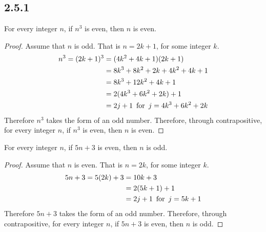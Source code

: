 





\subsection*{2.5.1}
\begin{enumerate}
   For every integer $n$, if $n^3$ is even, then $n$ is even.
  \begin{proof}
    Assume that $n$ is odd. That is $n = 2k+1$, for some integer $k$.
    \begin{align*}
      n^3 = (2k+1)^3 & = (4k^2+4k+1)(2k+1)                \\
                     & = 8k^3 + 8k^2 + 2k + 4k^2 + 4k + 1 \\
                     & = 8k^3 + 12k^2 + 4k + 1            \\
                     & = 2(4k^3+6k^2+2k) + 1              \\
                     & = 2j+1 \operatorname{~\text{for}~} j = 4k^3+6k^2+2k
    \end{align*}
    Therefore $n^3$ takes the form of an odd number.
    Therefore, through contrapositive, for every integer $n$, if $n^3$ is even,
    then $n$ is even.
  \end{proof}
   For every integer $n$, if $5n+3$ is even, then $n$ is odd.
  \begin{proof}
    Assume that $n$ is even. That is $n = 2k$, for some integer $k$.
    \begin{align*}
      5n+3 = 5(2k) + 3 & = 10k + 3             \\
                       & = 2(5k+1) + 1         \\
                       & = 2j+1 \operatorname{~\text{for}~} j = 5k+1
    \end{align*}
    Therefore $5n+3$ takes the form of an odd number.
    Therefore, through contrapositive, for every integer $n$, if $5n+3$ is even,
    then $n$ is odd.
  \end{proof}
\end{enumerate}

